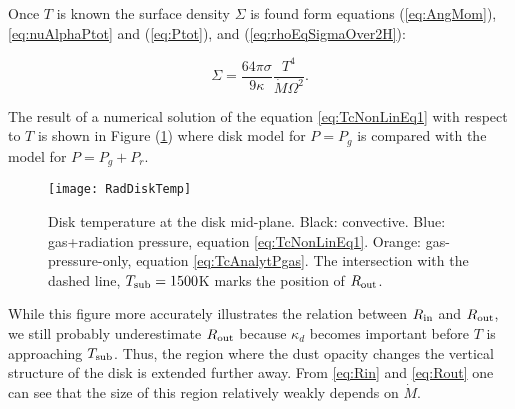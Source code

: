 \documentclass[12pt,english,preprint]{aastex}
\newcommand{\su}[2]{#1_{\rm #2}}
\newcommand{\Rout}{\su{R}{out}}
\newcommand{\Rin}{\su{R}{in}}
\newcommand{\Tc}{T}
\begin{document}
Once $\Tc$ is known the surface
density $\Sigma$ is found form equations 
(\ref{eq:AngMom}),\eqref{eq:nuAlphaPtot} and (\ref{eq:Ptot}),
and (\ref{eq:rhoEqSigmaOver2H}):


\begin{equation}
\Sigma=\frac{64\pi\sigma}{9 \kappa} 
\frac{\Tc^{4}}{\dot{M}\Omega^{2}}
\mbox{.}\label{eq:SigmaSolArbP}
\end{equation}

\noindent The result of a numerical solution of the equation 
\eqref{eq:TcNonLinEq1}
with respect to $\Tc$ is shown in 
Figure (\ref{fig:RadDiskTempPlot}) where 
disk model for $P=P_g$ is compared with the model for
$P=P_g+P_r$.


\begin{figure}
  \texttt{[image: RadDiskTemp]} 
  \caption{
  Disk temperature at the disk mid-plane.  
  Black: convective.  Blue: gas+radiation pressure, 
  equation \eqref{eq:TcNonLinEq1}.
  Orange: gas-pressure-only,
  equation \eqref{eq:TcAnalytPgas}. 
  The intersection with the dashed line, $T_{{\rm sub}}=1500$K marks the 
  position of $\Rout$.}
  \label{fig:RadDiskTempPlot} 
  \end{figure}
  

While this figure more accurately illustrates the relation between
$\Rin$ and $\Rout$, we still probably underestimate $\Rout$
because $\kappa_d$ becomes important before $T$ is approaching
$T_{{\rm sub}}$. Thus, the region where the dust opacity changes the
vertical structure of the disk is extended further away. From
\eqref{eq:Rin} and \eqref{eq:Rout} one can see that the size of this
region relatively weakly depends on $\dot{M}$.

\newcommand{\Rie}[1]{\su{R}{in}  = #1}
\newcommand{\Rio}[1]{\su{R}{out} = #1}
\end{document}
